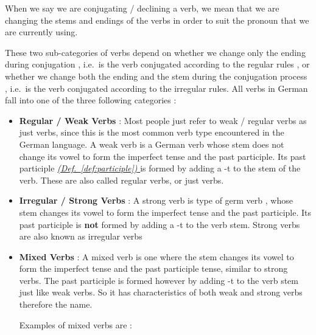 \documentclass[a4paper,twocolumn,10pt]{article}
\newcommand{\newpar}
{\par \vspace{0.3cm}}
\newcommand{\refdef}[1]
{
	\hyperref[def:#1]
	{
		\textit{(Def.~\ref{def:#1})}
	}
}
\begin{document}

When we say we are conjugating / declining a verb, we mean that we are changing
the stems and endings of the verbs in order to suit the pronoun that we are
currently using.\newpar

These two sub-categories of verbs depend on whether we change only the ending
during conjugation , i.e.\ is the verb conjugated according to the regular rules
, or whether we change both the ending and the stem during the conjugation
process , i.e.\ is the verb conjugated according to the irregular rules. All
verbs in German fall into one of the three following categories :\newpar


\begin{itemize}[noitemsep]
	
	\item \textbf{Regular / Weak Verbs} : Most people just refer to weak /
		regular verbs as just verbs, since this is the most common verb type
		encountered in the German language. A weak verb is a German verb whose
		stem does not change its vowel to form the imperfect tense and the past
		participle. Its past participle \refdef{participle} is formed by adding a -t to the stem of
		the verb. These are also called regular verbs, or just verbs.


	\newpar

	\item \textbf{Irregular / Strong Verbs} : A strong verb is type of germ verb
		, whose stem changes its vowel to form the imperfect tense and the past
		participle. Its past participle is \textbf{not} formed by adding a -t to
		the verb stem. Strong verbs are also known as irregular verbs

	\newpar

	\item \textbf{Mixed Verbs} : A mixed verb is one where the stem changes its
		vowel to form the imperfect tense and the past participle tense, similar
		to strong verbs. The past participle is formed however by adding -t to
		the verb stem just like weak verbs\cite{collins_german_grammar}. So it
		has characteristics of both weak and strong verbs therefore the
		name.\newpar

		Examples of mixed verbs are : 


\end{itemize}

\end{document}
